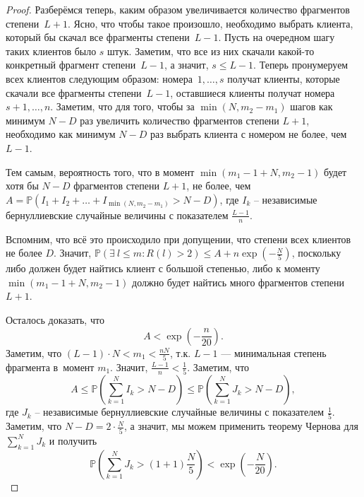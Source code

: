 \documentclass{matmex-diploma-custom}
\newcommand{\PRob}{\mathbb P}
\newcommand{\leqs}{\leqslant}
\theoremstyle{named}
\begin{document}
\begin{proof}
Разберёмся теперь, каким образом увеличивается количество фрагментов степени~$L+1$. 
Ясно, что чтобы такое произошло, необходимо выбрать клиента, который бы скачал все фрагменты степени~$L-1$. 
Пусть на очередном шагу таких клиентов было $s$ штук. Заметим, что все из них скачали какой-то конкретный фрагмент степени~$L-1$, 
а значит, $s \leqs L-1$. Теперь пронумеруем всех клиентов следующим образом: номера~$1, \dots, s$ получат клиенты, 
которые скачали все фрагменты степени~$L-1$, оставшиеся клиенты получат номера~$s +1, \dots, n$.
Заметим, что для того, чтобы за $\min(N, m_2 - m_1)$ шагов как минимум $N-D$ раз увеличить количество фрагментов степени $L+1$,
необходимо как минимум $N-D$ раз выбрать клиента с номером не более, чем $L-1$.

Тем самым, вероятность того, что в момент $\min(m_1 - 1 + N, m_2 - 1)$ будет хотя бы $N-D$ фрагментов степени $L+1$, 
не более, чем $ A = \PRob(I_1 + I_2 + \dots + I_{\min(N, m_2 - m_1)} > N - D)$, 
где $I_k$ -- независимые бернуллиевские случайные величины с показателем $\frac{L-1}{n}$.

Вспомним, что всё это происходило при допущении, что степени всех клиентов не более $D$. 
Значит, $\PRob\left(\exists~ l \leqs m : R(l) > 2 \right) \leqs A +  n\exp\left(-\frac{N}{5}\right)$, 
поскольку либо должен будет найтись клиент с большой степенью, 
либо к моменту $\min(m_1 - 1 + N, m_2 - 1)$ должно будет найтись много фрагментов степени $L+1$.

Осталось доказать, что 
\begin{equation}
A < \exp\left(- \frac{n}{20}\right).
\end{equation}
Заметим, что $(L-1)\cdot N < m_1 < \frac{nN}{5}$, т.к. $L-1$ --- минимальная степень фрагмента в~момент $m_1$.
Значит, $\frac{L-1}{n} < \frac{1}{5}$. Заметим, что
\begin{equation}
A \leqs \PRob\left(\sum_{k = 1}^N I_k > N - D\right) \leqs \PRob\left(\sum_{k = 1}^N J_k > N - D\right),
\end{equation}
где $J_k$ -- независимые бернуллиевские случайные величины с показателем $\frac{1}{5}$. 
Заметим, что $N - D = 2\cdot \frac{N}{5}$, а значит, мы можем применить 
теорему Чернова для $\sum\limits_{k = 1}^N J_k$ и получить
\begin{equation}
\PRob\left(\sum_{k = 1}^N J_k > (1 + 1) \frac{N}{5}\right) < \exp\left( - \frac{N}{20}\right).
\end{equation}
\end{proof}
\end{document}
